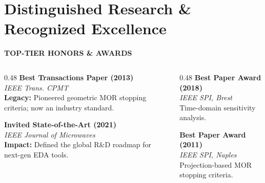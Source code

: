 \section{Distinguished Research \& Recognized Excellence}

\begin{frame}[t]{\insertsectionhead}
	\vspace{1ex}

	\begin{exampleblock}{\small \textbf{TOP-TIER HONORS \& AWARDS}}
		\vspace{1ex}
		\small
		\begin{columns}[t, onlytextwidth]
			\begin{column}{0.48\textwidth}
				\textbf{\textcolor{blue!80!black}{Best Transactions Paper (2013)}} \\
				\textit{IEEE Trans. CPMT} \\
				\textbf{Legacy:} Pioneered geometric MOR stopping criteria; now an industry standard.

				\vspace{1.5ex}

				\textbf{\textcolor{blue!80!black}{Invited State-of-the-Art (2021)}} \\
				\textit{IEEE Journal of Microwaves} \\
				\textbf{Impact:} Defined the global R\&D roadmap for next-gen EDA tools.
			\end{column}

			\begin{column}{0.48\textwidth}
				\textbf{\textcolor{blue!80!black}{Best Paper Award (2018)}} \\
				\textit{IEEE SPI, Brest} \\
				Time-domain sensitivity analysis.

				\vspace{1.5ex}

				\textbf{\textcolor{blue!80!black}{Best Paper Award (2011)}} \\
				\textit{IEEE SPI, Naples} \\
				Projection-based MOR stopping criteria.
			\end{column}
		\end{columns}
		\vspace{1ex}
	\end{exampleblock}


\end{frame}
